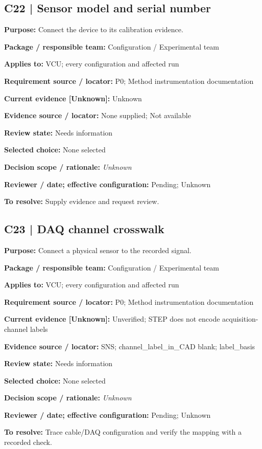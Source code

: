 \documentclass[11pt]{article}
\begin{document}
\begin{minipage}{\textwidth}\small\setlength{\parskip}{2pt}
\subsection*{C22 | Sensor model and serial number}
\textbf{Purpose:} Connect the device to its calibration evidence.\par
\textbf{Package / responsible team:} Configuration / Experimental team\par
\textbf{Applies to:} VCU; every configuration and affected run\par
\textbf{Requirement source / locator:} P0; Method instrumentation documentation\par
\textbf{Current evidence [Unknown]:} Unknown\par
\textbf{Evidence source / locator:} None supplied; Not available\par
\textbf{Review state:} Needs information\par
\textbf{Selected choice:} None selected\par
\textbf{Decision scope / rationale:} \textit{Unknown}\par
\textbf{Reviewer / date; effective configuration:} Pending; Unknown\par
\textbf{To resolve:} Supply evidence and request review.\par
\end{minipage}\par\vspace{5pt}
\begin{minipage}{\textwidth}\small\setlength{\parskip}{2pt}
\subsection*{C23 | DAQ channel crosswalk}
\textbf{Purpose:} Connect a physical sensor to the recorded signal.\par
\textbf{Package / responsible team:} Configuration / Experimental team\par
\textbf{Applies to:} VCU; every configuration and affected run\par
\textbf{Requirement source / locator:} P0; Method instrumentation documentation\par
\textbf{Current evidence [Unknown]:} Unverified; STEP does not encode acquisition-channel labels\par
\textbf{Evidence source / locator:} SNS; channel\_\allowbreak{}label\_\allowbreak{}in\_\allowbreak{}CAD blank; label\_\allowbreak{}basis\par
\textbf{Review state:} Needs information\par
\textbf{Selected choice:} None selected\par
\textbf{Decision scope / rationale:} \textit{Unknown}\par
\textbf{Reviewer / date; effective configuration:} Pending; Unknown\par
\textbf{To resolve:} Trace cable/DAQ configuration and verify the mapping with a recorded check.\par
\end{minipage}\par\vspace{5pt}
\end{document}
